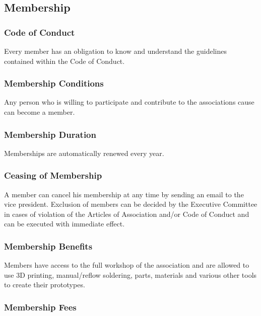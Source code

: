 \documentclass[12pt,a4paper,oneside]{article}
\newcounter{art}
\newcommand{\english}{    \switchcolumn[0]\noindent}
\begin{document}
\begin{paracol}{2}
\begin{enumerate}[(a)]
	\end{enumerate}


\english
	\subsection{Membership}


\english
	\subsubsection{Code of Conduct}
	Every member has an obligation to know and understand the guidelines contained within the Code of Conduct.


\english
	\subsubsection{Membership Conditions}
	Any person who is willing to participate and contribute to the associations cause can become a member.


\english
	\subsubsection{Membership Duration}
	Memberships are automatically renewed every year.




\english
	\subsubsection{Ceasing of Membership}
	A member can cancel his membership at any time by sending an email to the vice president. Exclusion of members can be decided by the Executive Committee in cases of violation of the Articles of Association and/or Code of Conduct and can be executed with immediate effect.


\english
	\subsubsection{Membership Benefits}
	Members have access to the full workshop of the association and are allowed to use 3D printing, manual/reflow soldering, parts, materials and various other tools to create their prototypes.



\english
	\subsubsection{Membership Fees}


\end{paracol}
\end{document}
